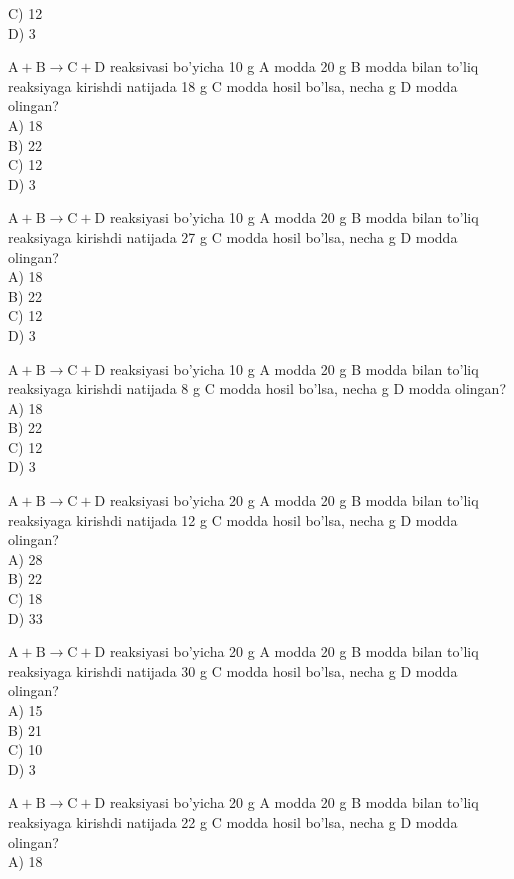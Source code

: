 C) 12\\
D) 3\\
  \item $\mathrm{A}+\mathrm{B} \rightarrow \mathrm{C}+\mathrm{D}$ reaksivasi bo'yicha 10 g A modda 20 g B modda bilan to'liq reaksiyaga kirishdi natijada 18 g C modda hosil bo'lsa, necha g D modda olingan?\\
A) 18\\
B) 22\\
C) 12\\
D) 3
  \item $\mathrm{A}+\mathrm{B} \rightarrow \mathrm{C}+\mathrm{D}$ reaksiyasi bo'yicha 10 g A modda 20 g B modda bilan to'liq reaksiyaga kirishdi natijada 27 g C modda hosil bo'lsa, necha g D modda olingan?\\
A) 18\\
B) 22\\
C) 12\\
D) 3
  \item $\mathrm{A}+\mathrm{B} \rightarrow \mathrm{C}+\mathrm{D}$ reaksiyasi bo'yicha 10 g A modda 20 g B modda bilan to'liq reaksiyaga kirishdi natijada 8 g C modda hosil bo'lsa, necha g D modda olingan?\\
A) 18\\
B) 22\\
C) 12\\
D) 3
  \item $\mathrm{A}+\mathrm{B} \rightarrow \mathrm{C}+\mathrm{D}$ reaksiyasi bo'yicha 20 g A modda 20 g B modda bilan to'liq reaksiyaga kirishdi natijada 12 g C modda hosil bo'lsa, necha g D modda olingan?\\
A) 28\\
B) 22\\
C) 18\\
D) 33
  \item $\mathrm{A}+\mathrm{B} \rightarrow \mathrm{C}+\mathrm{D}$ reaksiyasi bo'yicha 20 g A modda 20 g B modda bilan to'liq reaksiyaga kirishdi natijada 30 g C modda hosil bo'lsa, necha g D modda olingan?\\
A) 15\\
B) 21\\
C) 10\\
D) 3
  \item $\mathrm{A}+\mathrm{B} \rightarrow \mathrm{C}+\mathrm{D}$ reaksiyasi bo'yicha 20 g A modda 20 g B modda bilan to'liq reaksiyaga kirishdi natijada 22 g C modda hosil bo'lsa, necha g D modda olingan?\\
A) 18\\
